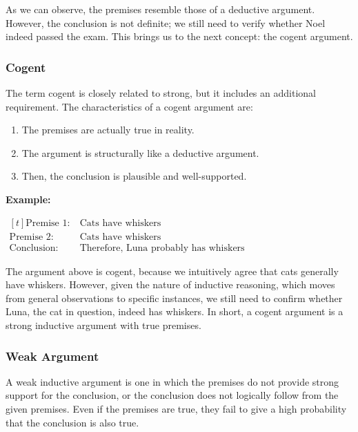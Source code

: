 \documentclass[12pt,a4paper,openany]{article}
\begin{document}
As we can observe, the premises resemble those of a deductive argument.
However, the conclusion is not definite; we still need to verify whether
Noel indeed passed the exam. This brings us to the next concept: the
cogent argument.

\subsubsection{Cogent}\label{cogent}

The term cogent is closely related to strong, but it includes an
additional requirement. The characteristics of a cogent argument are:

\begin{enumerate}
\def\labelenumi{\alph{enumi}.}
\item
The premises are actually true in reality.
\item
The argument is structurally like a deductive argument.
\item
Then, the conclusion is plausible and well-supported.
\end{enumerate}

\textbf{Example:}

\noindent
\(
\begin{aligned}[t]
\text{Premise 1:} \ & \text{Cats have whiskers} \\
\text{Premise 2:} \ & \text{Cats have whiskers} \\
\text{Conclusion:} \ & \text{Therefore, Luna probably has whiskers}
\end{aligned}
\)

The argument above is cogent, because we intuitively agree that cats
generally have whiskers. However, given the nature of inductive
reasoning, which moves from general observations to specific instances,
we still need to confirm whether Luna, the cat in question, indeed has
whiskers. In short, a cogent argument is a strong inductive argument
with true premises.

\subsubsection{Weak Argument}\label{weak-argument}

A weak inductive argument is one in which the premises do not provide
strong support for the conclusion, or the conclusion does not logically
follow from the given premises. Even if the premises are true, they fail
to give a high probability that the conclusion is also true.
\end{document}
